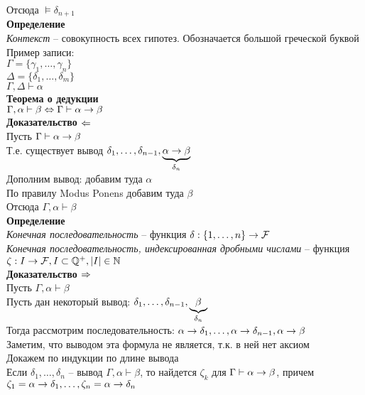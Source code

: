 \documentclass[12pt]{article}
\begin{document}
Отсюда $\models \delta_{n+1}$\\
\textbf{Определение}\\
\textit{Контекст} -- совокупность всех гипотез. Обозначается большой греческой буквой\\
Пример записи:\\
$\Gamma = \{ \gamma_1,\ldots, \gamma_n\}$\\
$\Delta = \{ \delta_1,\ldots, \delta_m \}$\\
$\Gamma,\Delta \vdash \alpha$\\
\textbf{Теорема о дедукции}\\
$\Gamma, \alpha \vdash \beta \Leftrightarrow \Gamma\vdash \alpha \rightarrow \beta$\\
\textbf{Доказательство $\Leftarrow$}\\
Пусть $\Gamma\vdash \alpha \rightarrow \beta$\\
Т.е. существует вывод $\delta_1,\ldots, \delta_{n-1}, \underbrace{\alpha \rightarrow \beta}_{\delta_n}$\\
Дополним вывод: добавим туда $\alpha$\\
По правилу Modus Ponens добавим туда $\beta$\\
Отсюда $\Gamma, \alpha \vdash \beta$\\
\textbf{Определение}\\
\textit{Конечная последовательность} -- функция $\delta: \{1,\ldots, n\} \rightarrow \mathcal F$\\
\textit{Конечная последовательность, индексированная дробными числами} -- функция $\zeta: I \rightarrow \mathcal F, I\subset \mathbb{Q}^+, |I|\in \mathbb{N}$\\
\textbf{Доказательство $\Rightarrow$}\\
Пусть $\Gamma, \alpha \vdash \beta$\\
Пусть дан некоторый вывод: $\delta_1, \ldots, \delta_{n-1}, \underbrace{\beta}_{\delta_n}$\\
Тогда рассмотрим последовательность: $\alpha \rightarrow \delta_1, \ldots, \alpha \rightarrow \delta_{n-1}, \alpha \rightarrow \beta$\\
Заметим, что выводом эта формула не является, т.к. в ней нет аксиом\\
Докажем по индукции по длине вывода\\
Если $\delta_1, \ldots, \delta_n$ -- вывод $\Gamma,\alpha\vdash \beta$, то найдется $\zeta_k$ для $\Gamma\vdash \alpha\rightarrow \beta$, причем $\zeta_1 =\alpha\rightarrow \delta_1, \ldots, \zeta_n=\alpha\rightarrow \delta_n$
\end{document}
